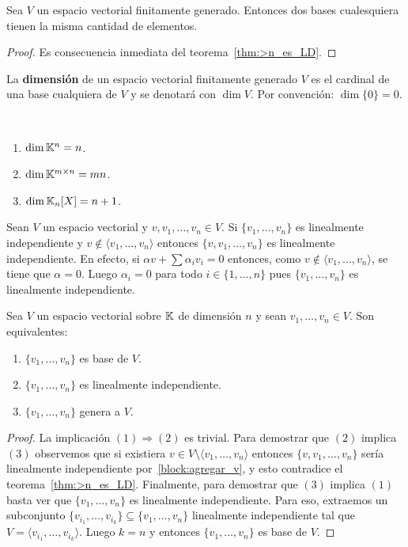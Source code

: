 \begin{cor}
	Sea $V$ un espacio vectorial finitamente generado. Entonces dos bases
	cualesquiera tienen la misma cantidad de elementos. 

	\begin{proof}
		Es consecuencia inmediata del teorema~\ref{thm:>n_es_LD}.
	\end{proof}
\end{cor}

\begin{block}
	La \textbf{dimensión} de un espacio vectorial finitamente generado $V$ es
	el cardinal de una base cualquiera de $V$ y se denotará con $\dim V$. Por
	convención: $\dim\{0\}=0$. 
\end{block}

\begin{examples}\
	\begin{enumerate}
		\item $\dim\mathbb{K}^n=n$.
		\item $\dim\mathbb{K}^{m\times n}=mn$.
		\item $\dim\mathbb{K}_n[X]=n+1$.
	\end{enumerate}
\end{examples}

\begin{block}
	\label{block:agregar_v}
	Sean $V$ un espacio vectorial y $v,v_1,\dots,v_n\in V$. Si
	$\{v_1,\dots,v_n\}$ es linealmente independiente y $v\not\in\langle
	v_1,\dots,v_n\rangle$ entonces $\{v,v_1,\dots,v_n\}$ es linealmente
	independiente.  En efecto, si $\alpha v+\sum \alpha_iv_i=0$ entonces, como
	$v\not\in\langle v_1,\dots,v_n\rangle$, se tiene que $\alpha=0$. Luego
	$\alpha_i=0$ para todo $i\in\{1,\dots,n\}$ pues $\{v_1,\dots,v_n\}$ es
	linealmente independiente.
\end{block}

\begin{cor}
	Sea $V$ un espacio vectorial sobre $\mathbb{K}$ de dimensión $n$ y sean
	$v_1,\dots,v_n\in V$. Son equivalentes:
	\begin{enumerate}
		\item $\{v_1,\dots,v_n\}$ es base de $V$.
		\item $\{v_1,\dots,v_n\}$ es linealmente independiente.
		\item $\{v_1,\dots,v_n\}$ genera a $V$.
	\end{enumerate}

	\begin{proof}
		La implicación $(1)\Rightarrow(2)$ es trivial. Para demostrar que $(2)$ implica 
		$(3)$ observemos que si existiera $v\in V\setminus\langle
		v_1,\dots,v_n\rangle$ entonces $\{v,v_1,\dots,v_n\}$ sería linealmente
		independiente por~\ref{block:agregar_v}, y esto contradice el
		teorema~\ref{thm:>n_es_LD}. Finalmente, para demostrar que $(3)$ implica $(1)$ basta
		ver que $\{v_1,\dots,v_n\}$ es linealmente independiente. Para eso, extraemos un
		subconjunto $\{v_{i_1},\dots,v_{i_k}\} \subseteq \{v_1,\dots,v_n\}$
		linealmente independiente tal que $V=\langle
		v_{i_1},\dots,v_{i_k}\rangle$. Luego $k=n$ y entonces
		$\{v_1,\dots,v_n\}$ es base de $V$.
	\end{proof}
\end{cor}

